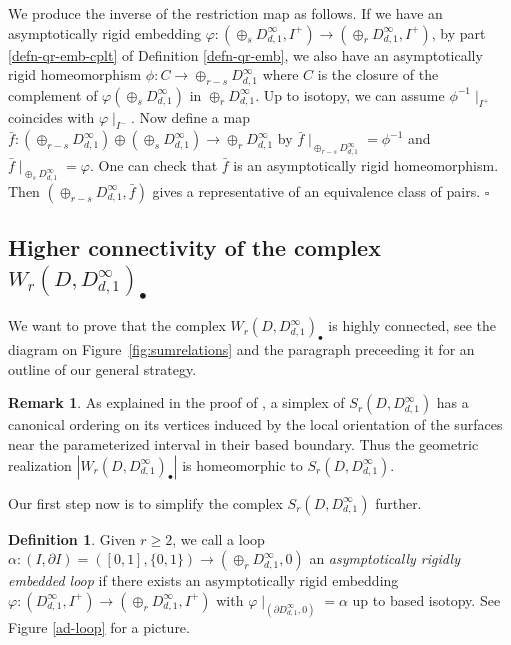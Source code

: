 \documentclass[11pt, a4paper]{amsart}
\theoremstyle{definition}
\newtheorem{rem}[thm]{Remark}
\newtheorem{defn}[thm]{Definition} %
\def\qed{\hfill$\square$\smallskip}
\begin{document}
We produce the inverse of the restriction map as follows. If we have an asymptotically rigid embedding $\varphi : (\oplus_s D^{\infty}_{d,1},I^+ )\to  (\oplus_r D^{\infty}_{d,1},I^+)$, by part \ref{defn-qr-emb-cplt} of Definition \ref{defn-qr-emb}, we also have an asymptotically rigid homeomorphism $\phi: C \to \oplus_{r-s} D^{\infty}_{d,1}$ where $C$ is the closure of the complement of $\varphi(\oplus_s D^{\infty}_{d,1})$ in $\oplus_{r} D^{\infty}_{d,1}$. Up to isotopy, we can assume $\phi^{-1}\mid_{I^+}$  coincides with $\varphi\mid_{I^-}$. Now define a map $\bar{f}: (\oplus_{r-s} D^{\infty}_{d,1}) \oplus (\oplus_s D^{\infty}_{d,1}) \to  \oplus_{r} D^{\infty}_{d,1}$ by $\bar{f}\mid_{\oplus_{r-s} D^{\infty}_{d,1}} =  \phi^{-1}$ and $\bar{f}\mid_{\oplus_s D^{\infty}_{d,1}} = \varphi$. One can check that $\bar{f}$ is an asymptotically rigid homeomorphism. Then $(\oplus_{r-s} D^{\infty}_{d,1},\bar f)$ gives a representative of an equivalence class of pairs. 
\qed






\subsection{Higher connectivity of the  complex $W_r(D,D^{\infty}_{d,1})_\bullet$}
We want to prove that the complex $W_r(D,D^{\infty}_{d,1})_\bullet$ is highly connected, see the diagram on Figure~\ref{fig:sumrelations}  and the paragraph preceeding it for an outline of our general strategy. 

\begin{rem}\label{rem:firstchange}
As explained in the proof of \cite[Lemma 5.21]{RWW17}, a simplex of $S_r(D,D^{\infty}_{d,1})$ has a canonical ordering on its vertices induced by the local orientation of the surfaces near the parameterized interval in their based boundary. Thus the geometric realization $|W_r(D,D^{\infty}_{d,1})_\bullet|$ is homeomorphic to $S_r(D,D^{\infty}_{d,1})$. 
\end{rem}

Our first step now is to simplify the complex $S_r(D,D^{\infty}_{d,1})$ further. 


\begin{defn}
Given $r\geq 2$, we call a loop $\alpha: (I, \partial I)=([0,1],\{0,1\}) \to (\oplus_r D^{\infty}_{d,1},0)$ an \emph{asymptotically rigidly embedded loop} if there exists an asymptotically rigid embedding $\varphi: (D^{\infty}_{d,1},I^+ )\to  (\oplus_r D^{\infty}_{d,1},I^+)$ with $\varphi \mid_{(\partial D^{\infty}_{d,1},0)} =\alpha$ up to based isotopy. See Figure \ref{ad-loop} for a picture.
\end{defn}
\end{document}
